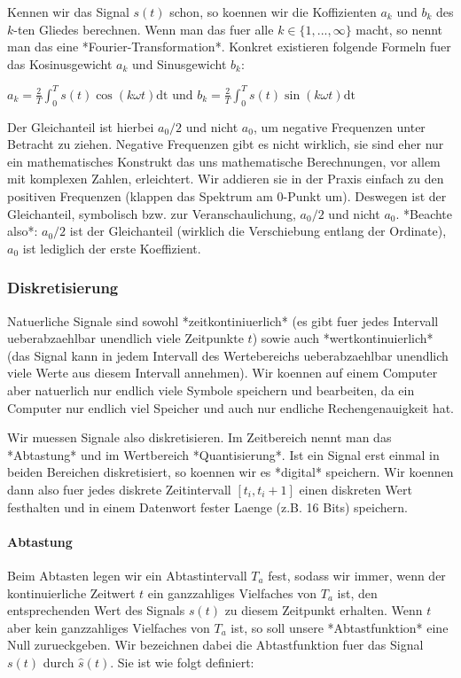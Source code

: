 Kennen wir das Signal $s(t)$ schon, so koennen wir die Koffizienten $a_k$ und
$b_k$ des $k$-ten Gliedes berechnen. Wenn man das fuer alle $k \in \{1, ...,
\infty\}$ macht, so nennt man das eine *Fourier-Transformation*. Konkret
existieren folgende Formeln fuer das Kosinusgewicht $a_k$ und Sinusgewicht
$b_k$:

$a_k = \frac{2}{T}\int_0^T s(t)\cos(k\omega t) \mathrm{dt} \text{ und } b_k =
\frac{2}{T}\int_0^T s(t)\sin(k\omega t) \mathrm{dt}$

Der Gleichanteil ist hierbei $a_0/2$ und nicht $a_0$, um negative Frequenzen
unter Betracht zu ziehen. Negative Frequenzen gibt es nicht wirklich, sie sind
eher nur ein mathematisches Konstrukt das uns mathematische Berechnungen, vor
allem mit komplexen Zahlen, erleichtert. Wir addieren sie in der Praxis einfach
zu den positiven Frequenzen (klappen das Spektrum am 0-Punkt um). Deswegen ist
der Gleichanteil, symbolisch bzw. zur Veranschaulichung, $a_0/2$ und nicht
$a_0$. *Beachte also*: $a_0/2$ ist der Gleichanteil (wirklich die Verschiebung
entlang der Ordinate), $a_0$ ist lediglich der erste Koeffizient.

\subsubsection{ Diskretisierung}

Natuerliche Signale sind sowohl *zeitkontiniuerlich* (es gibt fuer jedes
Intervall ueberabzaehlbar unendlich viele Zeitpunkte $t$) sowie auch
*wertkontinuierlich* (das Signal kann in jedem Intervall des Wertebereichs
ueberabzaehlbar unendlich viele Werte aus diesem Intervall annehmen). Wir
koennen auf einem Computer aber natuerlich nur endlich viele Symbole speichern
und bearbeiten, da ein Computer nur endlich viel Speicher und auch nur endliche
Rechengenauigkeit hat.

Wir muessen Signale also diskretisieren. Im Zeitbereich nennt man das
*Abtastung* und im Wertbereich *Quantisierung*. Ist ein Signal erst einmal in
beiden Bereichen diskretisiert, so koennen wir es *digital* speichern. Wir
koennen dann also fuer jedes diskrete Zeitintervall $[t_i, t_i + 1]$ einen
diskreten Wert festhalten und in einem Datenwort fester Laenge (z.B. 16 Bits)
speichern.

\paragraph{ Abtastung}

Beim Abtasten legen wir ein Abtastintervall $T_a$ fest, sodass wir immer, wenn
der kontinuierliche Zeitwert $t$ ein ganzzahliges Vielfaches von $T_a$ ist, den
entsprechenden Wert des Signals $s(t)$ zu diesem Zeitpunkt erhalten. Wenn $t$
aber kein ganzzahliges Vielfaches von $T_a$ ist, so soll unsere *Abtastfunktion*
eine Null zurueckgeben. Wir bezeichnen dabei die Abtastfunktion fuer das Signal
$s(t)$ durch $\hat{s}(t)$. Sie ist wie folgt definiert:

